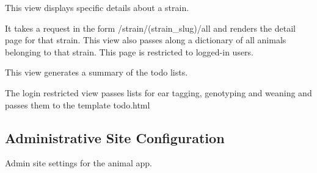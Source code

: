\documentclass[letterpaper,10pt,english]{sphinxmanual}
\begin{document}
\begin{fulllineitems}
\label{api:mousedb.animal.views.strain_detail_all}
This view displays specific details about a strain.

It takes a request in the form /strain/(strain\_slug)/all and renders the detail page for that strain.
This view also passes along a dictionary of all animals belonging to that strain.
This page is restricted to logged-in users.

\end{fulllineitems}



\begin{fulllineitems}
\label{api:mousedb.animal.views.todo}
This view generates a summary of the todo lists.

The login restricted view passes lists for ear tagging, genotyping and weaning and passes them to the template todo.html

\end{fulllineitems}

\label{api:module-mousedb.animal.urls}

\subsection{Administrative Site Configuration}
\label{api:id6}\label{api:module-mousedb.animal.admin}
Admin site settings for the animal app.

\end{document}
